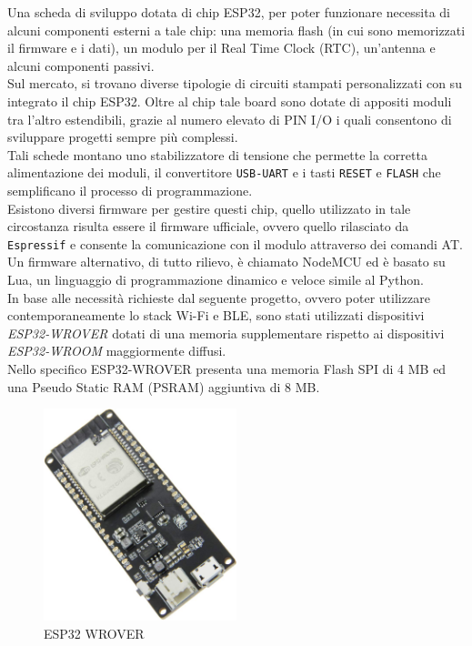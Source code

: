 \noindent Una scheda di sviluppo dotata di chip ESP32, per poter funzionare necessita di alcuni componenti esterni a tale chip: una memoria flash (in cui sono memorizzati il firmware e i dati), un modulo per il Real Time Clock (RTC), un'antenna e alcuni componenti passivi.\\
Sul mercato, si trovano diverse tipologie di circuiti stampati personalizzati con su integrato il chip ESP32. Oltre al chip tale board sono dotate di appositi moduli tra l'altro estendibili, grazie al numero elevato di PIN I/O i quali consentono di sviluppare progetti sempre più complessi.\\
Tali schede montano uno stabilizzatore di tensione che permette la corretta alimentazione dei moduli, il convertitore \texttt{USB-UART} e i tasti \texttt{RESET} e \texttt{FLASH} che semplificano il processo di programmazione. \\
Esistono diversi firmware per gestire questi chip, quello utilizzato in tale circostanza risulta essere il firmware ufficiale, ovvero quello rilasciato da \texttt{Espressif} e consente la comunicazione con il modulo attraverso dei comandi AT. %
Un firmware alternativo, di tutto rilievo, è chiamato NodeMCU ed è basato su Lua, un linguaggio di programmazione dinamico e veloce simile al Python.\\

\noindent In base alle necessità richieste dal seguente progetto, ovvero poter utilizzare contemporaneamente lo stack Wi-Fi e BLE, sono stati utilizzati dispositivi \textit{ESP32-WROVER} dotati di una memoria supplementare rispetto ai dispositivi \textit{ESP32-WROOM} maggiormente diffusi.\\
Nello specifico ESP32-WROVER presenta una memoria Flash SPI di 4 MB ed una Pseudo Static RAM (PSRAM) aggiuntiva di 8 MB.
\begin{figure}[!ht]
    \centering
    \includegraphics[width = 0.5\textwidth]{images/esp32_wrover.png}
    \caption{ESP32 WROVER}
    \label{fig:esp32_wrover}
\end{figure}

